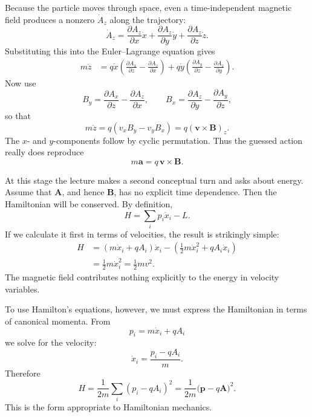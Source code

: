 Because the particle moves through space, even a time-independent magnetic field produces a nonzero \(\dot A_z\) along the trajectory:
\begin{equation}
\dot A_z
=
\frac{\partial A_z}{\partial x}\dot x
+
\frac{\partial A_z}{\partial y}\dot y
+
\frac{\partial A_z}{\partial z}\dot z.
\end{equation}
Substituting this into the Euler--Lagrange equation gives
\begin{align}
m\ddot z
&=
q\dot x\left(\frac{\partial A_x}{\partial z}-\frac{\partial A_z}{\partial x}\right)
+
q\dot y\left(\frac{\partial A_y}{\partial z}-\frac{\partial A_z}{\partial y}\right).
\end{align}
Now use
\[
B_y=\frac{\partial A_x}{\partial z}-\frac{\partial A_z}{\partial x},
\qquad
B_x=\frac{\partial A_z}{\partial y}-\frac{\partial A_y}{\partial z},
\]
so that
\begin{equation}
m\ddot z=q(v_xB_y-v_yB_x)=q(\mathbf v\times \mathbf B)_z.
\end{equation}
The \(x\)- and \(y\)-components follow by cyclic permutation. Thus the guessed action really does reproduce
\[
m\mathbf a=q\,\mathbf v\times \mathbf B.
\]

At this stage the lecture makes a second conceptual turn and asks about energy. Assume that \(\mathbf A\), and hence \(\mathbf B\), has no explicit time dependence. Then the Hamiltonian will be conserved. By definition,
\begin{equation}
H=\sum_i p_i\dot x_i-L.
\end{equation}
If we calculate it first in terms of velocities, the result is strikingly simple:
\begin{align}
H
&=
(m\dot x_i+qA_i)\dot x_i-\left(\frac12 m\dot x_i^2+qA_i\dot x_i\right) \\
&=
\frac12 m\dot x_i^2
=
\frac12 mv^2.
\end{align}
The magnetic field contributes nothing explicitly to the energy in velocity variables.

To use Hamilton's equations, however, we must express the Hamiltonian in terms of canonical momenta. From
\begin{equation}
p_i=m\dot x_i+qA_i
\end{equation}
we solve for the velocity:
\begin{equation}
\dot x_i=\frac{p_i-qA_i}{m}.
\end{equation}
Therefore
\begin{equation}
H=\frac{1}{2m}\sum_i (p_i-qA_i)^2
=
\frac{1}{2m}\bigl(\mathbf p-q\mathbf A\bigr)^2.
\end{equation}
This is the form appropriate to Hamiltonian mechanics.


